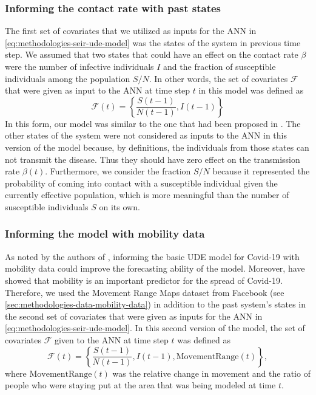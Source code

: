 \subsubsection{Informing the contact rate with past states}
The first set of covariates that we utilized as inputs for the \gls{ANN} in \autoref{eq:methodologies-seir-ude-model} was the states of the system in previous time step.
We assumed that two states that could have an effect on the contact rate $\beta$ were the number of infective individuals $I$ and the fraction of susceptible individuals among the population $S/N$.
In other words, the set of covariates $\mathcal{F}$ that were given as input to the \gls{ANN} at time step $t$ in this model was defined as
\begin{equation*}
    \mathcal{F}(t) = \left\lbrace \frac{S(t-1)}{N(t-1)}, I(t-1) \right\rbrace
\end{equation*}
In this form, our model was similar to the one that had been proposed in \cite{dandekarMachineLearningAidedGlobal2020a}.
The other states of the system were not considered as inputs to the \gls{ANN} in this version of the model because, by definitions, the individuals from those states can not transmit the disease.
Thus they should have zero effect on the transmission rate $\beta(t)$.
Furthermore, we consider the fraction $S/N$ because it represented the probability of coming into contact with a susceptible individual given the currently effective population, which is more meaningful than the number of susceptible individuals $S$ on its own.

\subsubsection{Informing the model with mobility data}

As noted by the authors of \cite{dandekarMachineLearningAidedGlobal2020a}, informing the basic \gls{UDE} model for Covid-19 with mobility data could improve the forecasting ability of the model.
Moreover, \cite{changMobilityNetworkModels2021,ihmecovid-19forecastingteamModelingCOVID19Scenarios2021,liSubstantialUndocumentedInfection2020} have showed that mobility is an important predictor for the spread of Covid-19.
Therefore, we used the Movement Range Maps dataset from Facebook (see \autoref{sec:methodologies-data-mobility-data}) in addition to the past system's states in the second set of covariates that were given as inputs for the \gls{ANN} in \autoref{eq:methodologies-seir-ude-model}.
In this second version of the model, the set of covariates $\mathcal{F}$ given to the \gls{ANN} at time step $t$ was defined as
\begin{equation*}
    \mathcal{F}(t) = \left\lbrace \frac{S(t-1)}{N(t-1)}, I(t-1), \text{MovementRange}(t) \right\rbrace,
\end{equation*}
where $\text{MovementRange}(t)$ was the relative change in movement and the ratio of people who were staying put at the area that was being modeled at time $t$.

